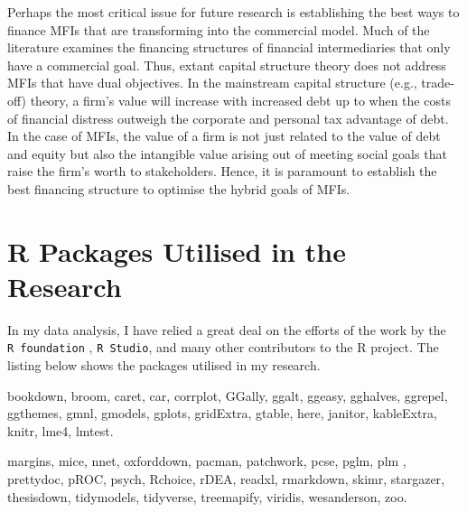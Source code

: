 \documentclass[a4paper, nobind]{templates/ociamthesis}
\begin{document}
Perhaps the most critical issue for future research is establishing the best ways to finance MFIs that are transforming into the commercial model. Much of the literature examines the financing structures of financial intermediaries that only have a commercial goal. Thus, extant capital structure theory does not address MFIs that have dual objectives. In the mainstream capital structure (e.g., trade-off) theory, a firm's value will increase with increased debt up to when the costs of financial distress outweigh the corporate and personal tax advantage of debt. In the case of MFIs, the value of a firm is not just related to the value of debt and equity but also the intangible value arising out of meeting social goals that raise the firm's worth to stakeholders. Hence, it is paramount to establish the best financing structure to optimise the hybrid goals of MFIs.

\startappendices

\hypertarget{r-packages-utilised-in-the-research}{%
\chapter{R Packages Utilised in the Research}\label{r-packages-utilised-in-the-research}}

In my data analysis, I have relied a great deal on the efforts of the work by the \texttt{R\ foundation} \autocite{R}, \texttt{R\ Studio}, and many other contributors to the R project. The listing below shows the packages utilised in my research.

bookdown\autocite{bookdown},
broom\autocite{broom},
caret\autocite{caret},
car\autocite{car},
corrplot\autocite{corrplot2021},
GGally\autocite{ggally},
ggalt\autocite{ggalt},
ggeasy\autocite{ggeasy},
gghalves\autocite{gghalves},
ggrepel\autocite{ggrepel},
ggthemes\autocite{ggthemes},
gmnl\autocite{gmnl},
gmodels\autocite{gmodels},
gplots\autocite{gplots},
gridExtra\autocite{gridextra},
gtable\autocite{gtable},
here\autocite{here},
janitor\autocite{janitor},
kableExtra\autocite{kableExtra},
knitr\autocite{knitr},
lme4\autocite{lme4},
lmtest\autocite{lmtest}.

margins\autocite{margins},
mice\autocite{mice},
nnet\autocite{nnet},
oxforddown\autocite{lyngsOxforddown2019},
pacman\autocite{pacman},
patchwork\autocite{patchwork},
pcse\autocite{pcse},
pglm\autocite{pglm},
plm \autocite{plm},
prettydoc\autocite{prettydoc},
pROC\autocite{pROC},
psych\autocite{psych},
Rchoice\autocite{rchoice},
rDEA\autocite{rdea},
readxl\autocite{readxl},
rmarkdown\autocite{rmarkdown},
skimr\autocite{skimr},
stargazer\autocite{stargazer},
thesisdown\autocite{thesisdown2021},
tidymodels\autocite{tidymodels},
tidyverse\autocite{tidyverse},
treemapify\autocite{treemap},
viridis\autocite{viridis},
wesanderson\autocite{wesanderson},
zoo\autocite{zoo}.
\end{document}
